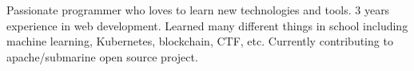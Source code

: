 

\begin{cvparagraph}

Passionate programmer who loves to learn new technologies and tools. 3 years experience in web development. Learned many different things in school including machine learning, Kubernetes, blockchain, CTF, etc. Currently contributing to apache/submarine open source project.
\end{cvparagraph}
